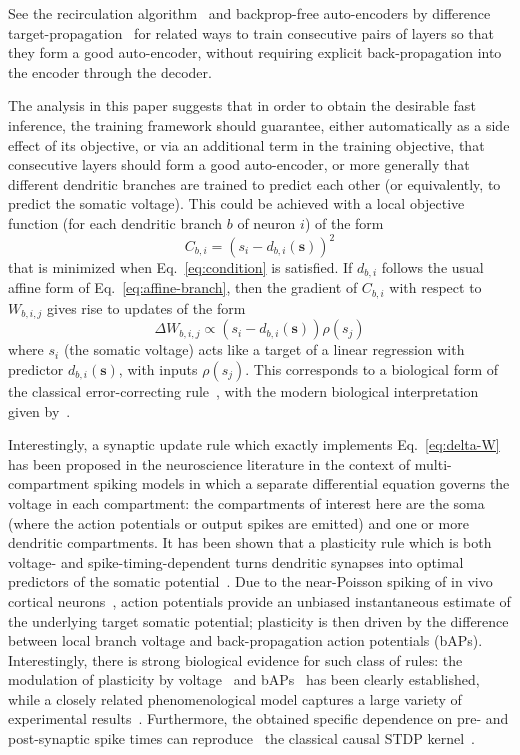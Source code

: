 \documentclass{article}
\newcommand   \vs{{\bm s}}
\begin{document}
See the recirculation algorithm~\citep{Hinton+McClelland-NIPS1987}
and backprop-free auto-encoders by difference target-propagation~\citep{Lee+Bengio-NIPSDL2014-small,Lee-et-al-MLKDB2015-small}
for related ways to train consecutive pairs of layers so that they form a good auto-encoder,
without requiring explicit back-propagation into the encoder through the decoder.

The analysis in this paper suggests that in order to obtain the desirable
fast inference, the training framework should guarantee, either automatically
as a side effect of its objective, or via an additional term in the training objective,
that consecutive layers should form a good auto-encoder, or more generally that
different dendritic branches are trained to predict each other (or equivalently,
to predict the somatic voltage). This could be achieved with a local
objective function (for each dendritic branch $b$ of neuron $i$) of the form
\begin{equation}
     C_{b,i} = (s_i - d_{b,i}(\vs))^2
\end{equation}
that is minimized when Eq.~\ref{eq:condition} is satisfied. If $d_{b,i}$
follows the usual affine form of Eq.~\ref{eq:affine-branch}, then
the gradient of $C_{b,i}$ with respect to $W_{b,i,j}$ gives rise
to updates of the form
\begin{equation}
  \label{eq:delta-W}
   \Delta W_{b,i,j} \propto (s_i - d_{b,i}(\vs)) \rho(s_j)
\end{equation}
where $s_i$ (the somatic voltage) acts like a target of a linear
regression with predictor $d_{b,i}(\vs)$, with inputs $\rho(s_j)$.
This corresponds to a biological form of the classical error-correcting
rule~\citep{Widrow62}, with the modern biological interpretation
given by~\citet{Urbanczik+Senn-2014}.

Interestingly, a synaptic update rule which exactly implements
Eq.~\ref{eq:delta-W} has been proposed in the neuroscience literature in the
context of multi-compartment spiking models in which a separate
differential equation governs the voltage in each compartment:
the compartments of interest here are the soma (where the action
potentials or output spikes are emitted) and one or more dendritic
compartments. It has been shown that a plasticity rule which is both voltage-
and spike-timing-dependent turns  dendritic synapses into optimal predictors
of the somatic potential~\citep{Urbanczik+Senn-2014}. Due to the near-Poisson
spiking of in vivo cortical neurons~\citep{Shadlen1998}, action potentials
provide an unbiased instantaneous estimate of the underlying target somatic
potential; plasticity is then driven by the difference between local branch
voltage and back-propagation action potentials (bAPs). Interestingly, there is
strong biological evidence for such class of rules: the modulation of
plasticity by voltage~\citep{Artola1990,Sjostrom2001} and
bAPs~\citep{Koester1998} has been clearly established, while a closely related
phenomenological model captures a large variety of experimental
results~\citep{Clopath2010}. Furthermore, the obtained specific dependence on
pre- and post-synaptic spike times can reproduce~\citep{Brea2013} the classical
causal STDP kernel~\citep{Gerstner1996}.
\end{document}
